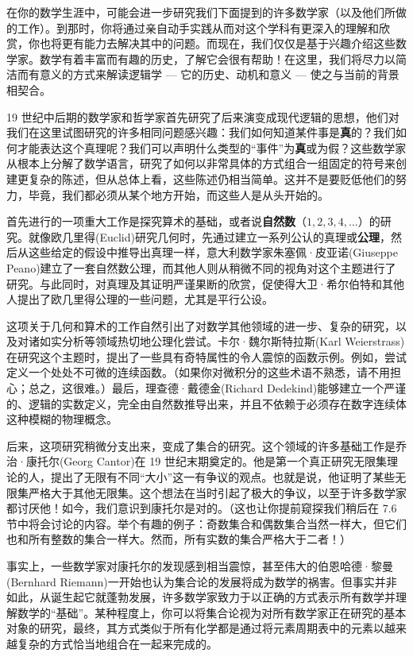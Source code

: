 在你的数学生涯中，可能会进一步研究我们下面提到的许多数学家（以及他们所做的工作）。到那时，你将通过亲自动手实践从而对这个学科有更深入的理解和欣赏，你也将更有能力去解决其中的问题。而现在，我们仅仅是基于兴趣介绍这些数学家。数学有着丰富而有趣的历史，了解它会很有帮助！在这里，我们将尽力以简洁而有意义的方式来解读逻辑学 --- 它的历史、动机和意义 --- 使之与当前的背景相契合。

19 世纪中后期的数学家和哲学家首先研究了后来演变成现代逻辑的思想，他们对我们在这里试图研究的许多相同问题感兴趣：我们如何知道某件事是\textbf{真}的？我们如何才能表达这个真理呢？我们可以声明什么类型的``事件''为\textbf{真}或为假？这些数学家从根本上分解了数学语言，研究了如何以非常具体的方式组合一组固定的符号来创建更复杂的陈述，但从总体上看，这些陈述仍相当简单。这并不是要贬低他们的努力，毕竟，我们都必须从某个地方开始，而这些人是从头开始的。

首先进行的一项重大工作是探究算术的基础，或者说\textbf{自然数}（$1,2,3,4,\dots$）的研究。就像欧几里得(Euclid)研究几何时，先通过建立一系列公认的真理或\textbf{公理}，然后从这些给定的假设中推导出真理一样，意大利数学家朱塞佩·皮亚诺(Giuseppe Peano)建立了一套自然数公理，而其他人则从稍微不同的视角对这个主题进行了研究。与此同时，对真理及其证明严谨果断的欣赏，促使得大卫·希尔伯特和其他人提出了欧几里得公理的一些问题，尤其是平行公设。

这项关于几何和算术的工作自然引出了对数学其他领域的进一步、复杂的研究，以及对诸如实分析等领域热切地公理化尝试。卡尔·魏尔斯特拉斯(Karl Weierstrass)在研究这个主题时，提出了一些具有奇特属性的令人震惊的函数示例。例如，尝试定义一个处处不可微的连续函数。（如果你对微积分的这些术语不熟悉，请不用担心；总之，这很难。）最后，理查德·戴德金(Richard Dedekind)能够建立一个严谨的、逻辑的实数定义，完全由自然数推导出来，并且不依赖于必须存在数字连续体这种模糊的物理概念。

后来，这项研究稍微分支出来，变成了集合的研究。这个领域的许多基础工作是乔治·康托尔(Georg Cantor)在 19 世纪末期奠定的。他是第一个真正研究无限集理论的人，提出了无限有不同``大小''这一有争议的观点。也就是说，他证明了某些无限集严格大于其他无限集。这个想法在当时引起了极大的争议，以至于许多数学家都讨厌他！如今，我们意识到康托尔是对的。（这也让你提前窥探我们稍后在 7.6节中将会讨论的内容。举个有趣的例子：奇数集合和偶数集合当然一样大，但它们也和所有整数的集合一样大。然而，所有实数的集合严格大于二者！）

事实上，一些数学家对康托尔的发现感到相当震惊，甚至伟大的伯恩哈德·黎曼(Bernhard Riemann)一开始也认为集合论的发展将成为数学的祸害。但事实并非如此，从诞生起它就蓬勃发展，许多数学家致力于以正确的方式表示所有数学并理解数学的``基础''。某种程度上，你可以将集合论视为对所有数学家正在研究的基本对象的研究，最终，其方式类似于所有化学都是通过将元素周期表中的元素以越来越复杂的方式恰当地组合在一起来完成的。


